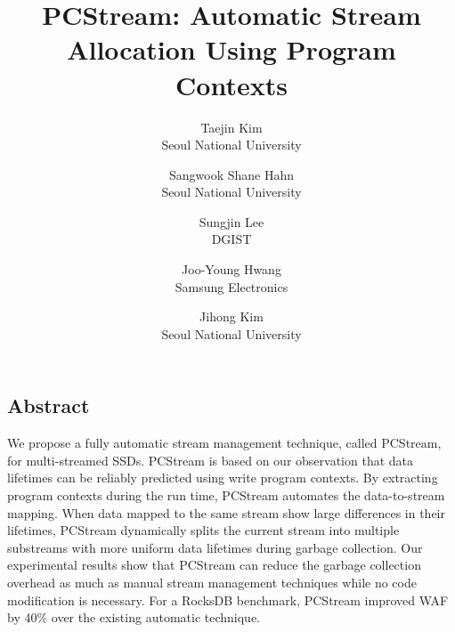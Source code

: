 \documentclass[letterpaper, twocolumn, 10pt]{article}
\begin{document}
\title{
\bf PCStream: Automatic Stream Allocation Using Program Contexts}


\author{
{\rm Taejin Kim}\\
Seoul National University
\and 
{\rm Sangwook Shane Hahn}\\
Seoul National University
\and 
{\rm Sungjin Lee}\\
DGIST
\and 
{\rm Joo-Young Hwang} \\
Samsung Electronics
\and 
{\rm Jihong Kim} \\
Seoul National University
}

\maketitle

\thispagestyle{empty}

\subsection*{Abstract}
We propose a fully automatic stream management technique, called {\sf PCStream}, 
for multi-streamed SSDs.
{\sf PCStream} is based on our observation that data lifetimes can be reliably predicted using
write program contexts.  
By extracting program contexts during the run time,  
{\sf PCStream}  automates the data-to-stream mapping.  
When data mapped to the same
stream show large differences in their lifetimes, {\sf PCStream}
dynamically splits the current stream into multiple substreams
with more uniform data lifetimes during garbage collection.
Our experimental results show that {\sf PCStream} can reduce the
garbage collection overhead as much as manual stream
management techniques while no code modification is necessary.
For a RocksDB benchmark, {\sf PCStream} improved WAF by 40\% over 
the existing automatic technique.








\end{document}
